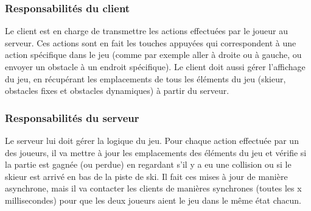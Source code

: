 \documentclass[a4paper,12pt]{article}
\begin{document}
	\subsubsection{Responsabilités du client}
	Le client est en charge de transmettre les actions effectuées par le joueur au serveur. Ces actions sont en fait les touches appuyées qui correspondent à  une action spécifique dans le jeu (comme par exemple aller à droite ou à gauche, ou envoyer un obstacle à un endroit spécifique). Le client doit aussi gérer l'affichage du jeu, en récupérant les emplacements de tous les éléments du jeu (skieur, obstacles fixes et obstacles dynamiques) à partir du serveur.
	
	\subsubsection{Responsabilités du serveur}
	Le serveur lui doit gérer la logique du jeu. Pour chaque action effectuée par un des joueurs, il va mettre à jour les emplacements des éléments du jeu et vérifie si la partie est gagnée (ou perdue) en regardant s'il y a eu une collision ou si le skieur est arrivé en bas de la piste de ski. Il fait ces mises à jour de manière asynchrone, mais il va contacter les clients de manières synchrones (toutes les x millisecondes) pour que les deux joueurs aient le jeu dans le même état chacun.
	
\end{document}
